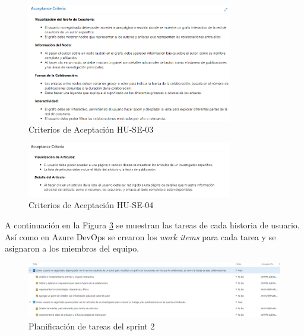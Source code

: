 \begin{figure}[H]
    \centering
    \includegraphics[width=0.8\textwidth]{../02Figures/02Chapter/Sprints/Sprint-2/aceptance-criteria-HU-SE-03.png}
    \caption{Criterios de Aceptación HU-SE-03}
    \label{C2F2:Criterios de Aceptacion HU-SE-03}
\end{figure}

\begin{figure}[H]
    \centering
    \includegraphics[width=0.8\textwidth]{../02Figures/02Chapter/Sprints/Sprint-2/aceptance-criteria-HU-SE-04.png}
    \caption{Criterios de Aceptación HU-SE-04}
    \label{C2F2:Criterios de Aceptacion HU-SE-04}
\end{figure}

A continuación en la Figura \ref{fig:azure-board-sprint-2} se muestran las tareas de cada historia de usuario. Así como en  Azure DevOps se crearon los \textit{work items} para cada tarea y se asignaron a los miembros del equipo.

\begin{figure}[H]
    \centering
    \includegraphics[width=1\textwidth]{../02Figures/02Chapter/Sprints/Sprint-2/fig_azure-board-sprint-2.png}
    \caption{Planificación de tareas del sprint 2}
    \label{fig:azure-board-sprint-2}
\end{figure}


